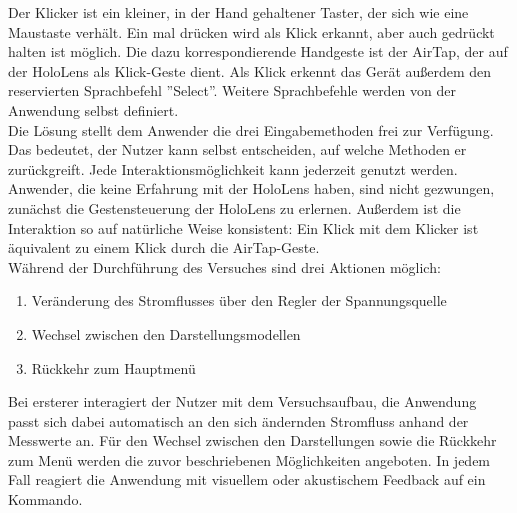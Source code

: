 Der Klicker ist ein kleiner, in der Hand gehaltener Taster, der sich wie eine Maustaste verhält. Ein mal drücken wird als Klick erkannt, aber auch gedrückt halten ist möglich.
Die dazu korrespondierende Handgeste ist der AirTap, der auf der HoloLens als Klick-Geste dient. Als Klick erkennt das Gerät außerdem den reservierten Sprachbefehl ''Select''. Weitere Sprachbefehle werden von der Anwendung selbst definiert.\\

Die Lösung stellt dem Anwender die drei Eingabemethoden frei zur Verfügung. Das bedeutet, der Nutzer kann selbst entscheiden, auf welche Methoden er zurückgreift. Jede Interaktionsmöglichkeit kann jederzeit genutzt werden. Anwender, die keine Erfahrung mit der HoloLens haben, sind nicht gezwungen, zunächst die Gestensteuerung der HoloLens zu erlernen. Außerdem ist die Interaktion so auf natürliche Weise konsistent: Ein Klick mit dem Klicker ist äquivalent zu einem Klick durch die AirTap-Geste.\\

Während der Durchführung des Versuches sind drei Aktionen möglich:
\begin{enumerate}[topsep=-2px]
	\setlength{\itemsep}{-5pt}
	\item Veränderung des Stromflusses über den Regler der Spannungsquelle
	\item Wechsel zwischen den Darstellungsmodellen
	\item Rückkehr zum Hauptmenü
\end{enumerate}
\vspace{8px}

Bei ersterer interagiert der Nutzer mit dem Versuchsaufbau, die Anwendung passt sich dabei automatisch an den sich ändernden Stromfluss anhand der Messwerte an. Für den Wechsel zwischen den Darstellungen sowie die Rückkehr zum Menü werden die zuvor beschriebenen Möglichkeiten angeboten. In jedem Fall reagiert die Anwendung mit visuellem oder akustischem Feedback auf ein Kommando.\\


